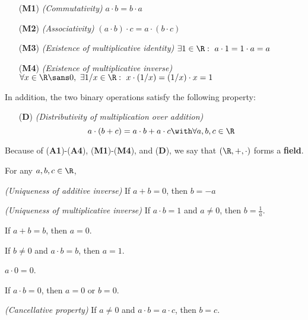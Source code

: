 \begin{itemize}
  \item [(\textbf{M1})] \textit{(Commutativity)} $a\cdot b=b\cdot a$
  \item [(\textbf{M2})] \textit{(Associativity)} $(a\cdot b)\cdot c=a\cdot
        (b\cdot c)$
  \item [(\textbf{M3})] \textit{(Existence of multiplicative identity)} $\exists1\in\R:\ a\cdot 1=1\cdot a=a$
  \item [(\textbf{M4})] \textit{(Existence of multiplicative inverse)} $\forall
        x\in\R\sans0,\ \exists 1/x\in\R:\ x\cdot(1/x)=(1/x)\cdot x=1$
\end{itemize}

In addition, the two binary operations satisfy the following property:
\begin{itemize}
  \item [(\textbf{D})] \textit{(Distributivity of multiplication over addition)}
        $$
          a\cdot(b+c)=a\cdot b+a\cdot c\with\forall a,b,c\in\R
        $$
\end{itemize}

Because of (\textbf{A1})-(\textbf{A4}), (\textbf{M1})-(\textbf{M4}), and
(\textbf{D}), we say that $(\R,+,\cdot)$ forms a \textbf{field}.

\label{a1bdcab}

For any $a,b,c\in\R$,

\begin{enumerati}
  \item \textit{(Uniqueness of additive inverse)} If $a+b=0$, then $b={-}a$
  \item \textit{(Uniqueness of multiplicative inverse)} If $a\cdot b=1$ and
  $a\neq0$, then $b=\frac1a$.
  \item If $a+b=b$, then $a=0$.
  \item If $b\neq0$ and $a\cdot b=b$, then $a=1$.
  \item $a\cdot0=0$.
  \item If $a\cdot b=0$, then $a=0$ or $b=0$.
  \item \textit{(Cancellative property)} If $a\neq0$ and $a\cdot b=a\cdot c$, then $b=c$.
\end{enumerati}

